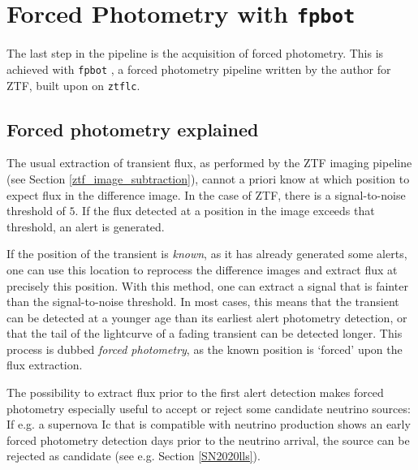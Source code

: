 \documentclass[
    a4paper, %
    fontsize=10pt, %
    twoside=true, %
    numbers=noenddot, %
    fontmethod=tex,
]{kaobook}
\begin{document}
\section{Forced Photometry with \texttt{fpbot}} \label{fpbot}
The last step in the pipeline is the acquisition of forced photometry. This is achieved with \texttt{fpbot} , a forced photometry pipeline written by the author for ZTF, built upon on \texttt{ztflc}.

\subsection{Forced photometry explained}
The usual extraction of transient flux, as performed by the ZTF imaging pipeline (see Section \ref{ztf_image_subtraction}), cannot a priori know at which position to expect flux in the difference image. In the case of ZTF, there is a signal-to-noise threshold of $5$. If the flux detected at a position in the image exceeds that threshold, an alert is generated.

If the position of the transient is \textit{known}, as it has already generated some alerts, one can use this location to reprocess the difference images and extract flux at precisely this position. With this method, one can extract a signal that is fainter than the signal-to-noise threshold. In most cases, this means that the transient can be detected at a younger age than its earliest alert photometry detection, or that the tail of the lightcurve of a fading transient can be detected longer. This process is dubbed \textit{forced photometry}, as the known position is `forced' upon the flux extraction.

The possibility to extract flux prior to the first alert detection makes forced photometry especially useful to accept or reject some candidate neutrino sources: If e.g. a supernova Ic that is compatible with neutrino production shows an early forced photometry detection days prior to the neutrino arrival, the source can be rejected as candidate (see e.g. Section \ref{SN2020lls}).
\end{document}
